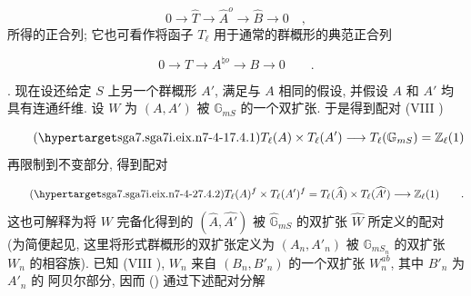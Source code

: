 \begin{equation*}
0 \longrightarrow \widehat{T} \longrightarrow \widehat{A}^{o}
 \longrightarrow \widehat{B} \longrightarrow 0 \quad ,
\end{equation*}
所得的正合列; 它也可看作将函子 $T_{\ell}$ 用于通常的群概形的典范正合列

\begin{equation*}
0 \longrightarrow T \longrightarrow A^{\natural o}
 \longrightarrow B \longrightarrow 0 \qquad .
\end{equation*}



\medskip
\noindent
{}. 现在设还给定 $S$ 上另一个群概形 $A'$, 满足与 $A$ 相同的假设, 并假设 $A$ 和 $A'$ 均具有连通纤维. 设 $W$ 为 $(A,A')$ 被 $\mathbb G_{mS}$ 的一个双扩张. 于是得到配对 (VIII )

\begin{equation}\tag{\SGARefTarget{sga7.sga7i.eix.n7-4-1}{7.4.1}}
T_{\ell}(A) \times T_{\ell}(A') \longrightarrow
T_{\ell}(\mathbb G_{mS}) = \mathbb Z_{\ell}(1)
\end{equation}
再限制到不变部分, 得到配对

\begin{equation}\tag{\SGARefTarget{sga7.sga7i.eix.n7-4-2}{7.4.2}}
T_{\ell}(A)^{f} \times T_{\ell}(A')^{f}
 = T_{\ell}(\widehat A) \times T_{\ell}(\widehat {A'})
 \longrightarrow \mathbb Z_{\ell}(1) \qquad .
\end{equation}
这也可解释为将 $W$ 完备化得到的 $(\widehat A,\widehat {A'})$ 被 $\widehat{\mathbb G}_{mS}$ 的双扩张 $\widehat W$ 所定义的配对 (为简便起见, 这里将形式群概形的双扩张定义为 $(A_n,A'_n)$ 被 $\mathbb G_{mS_n}$ 的双扩张 $W_n$ 的相容族). 已知 (VIII ), $W_n$ 来自 $(B_n,B'_n)$ 的一个双扩张 $W_n^{ab}$, 其中 $B'_n$ 为 $A'_n$ 的 阿贝尔部分, 因而 () 通过下述配对分解

